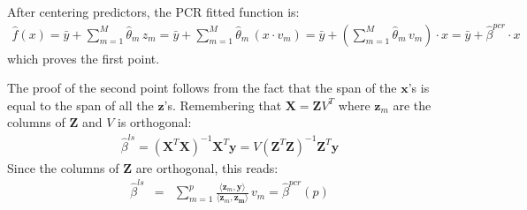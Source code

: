 


After centering predictors, the PCR fitted function is:
\begin{eqnarray*}
    \hat{f}(x) = \bar{y} +\sum_{m=1}^M \hat{\theta}_m \, z_m = \bar{y} + \sum_{m=1}^M \hat{\theta}_m \, (x \cdot v_m) = \bar{y} + \left( \sum_{m=1}^M \hat{\theta}_m \, v_m\right) \cdot x = \bar{y} + \hat{\beta}^{pcr} \cdot x
\end{eqnarray*} 
which proves the first point.

The proof of the second point follows from the fact that the span of the $\mathbf{x}$'s is equal to
the span of all the $\mathbf{z}$'s. Remembering that $\mathbf{X} = \mathbf{Z}V^T$ where $\mathbf{z}_m$ are the columns of $\mathbf{Z}$ and $V$ is orthogonal:
\begin{eqnarray*}
    \hat{\beta}^{ls}  =  \left( \mathbf{X}^T \mathbf{X} \right)^{-1} \mathbf{X}^T \mathbf{y} =
    V \left( \mathbf{Z}^T \mathbf{Z} \right)^{-1} \mathbf{Z}^T \mathbf{y}
\end{eqnarray*}
Since the columns of $\mathbf{Z}$ are orthogonal, this reads:
\begin{eqnarray*}
    \hat{\beta}^{ls} & = & \sum_{m=1}^{p} \frac{\langle \mathbf{z}_m, \mathbf{y} \rangle}{\langle \mathbf{z}_m, \mathbf{z_m} \rangle} \, v_m = \hat{\beta}^{pcr}(p)
\end{eqnarray*}